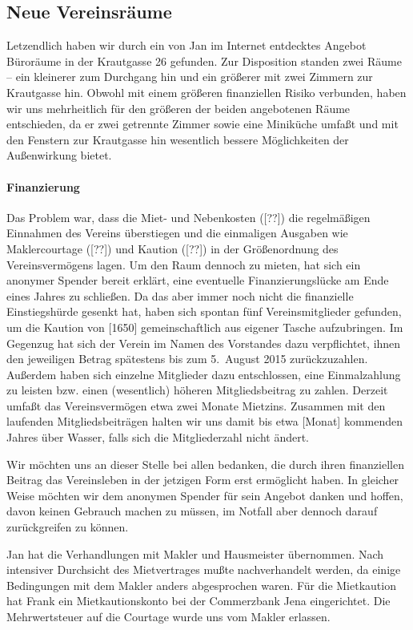 \documentclass[10pt,DIV16]{scrartcl}
\begin{document}
\subsection{Neue Vereinsräume}

Letzendlich haben wir durch ein von Jan im Internet entdecktes Angebot
Büroräume in der Krautgasse 26 gefunden.  Zur Disposition standen zwei Räume
-- ein kleinerer zum Durchgang hin und ein größerer mit zwei Zimmern zur
Krautgasse hin.  Obwohl mit einem größeren finanziellen Risiko verbunden,
haben wir uns mehrheitlich für den größeren der beiden angebotenen Räume
entschieden, da er zwei getrennte Zimmer sowie eine Miniküche umfaßt und mit
den Fenstern zur Krautgasse hin wesentlich bessere Möglichkeiten der
Außenwirkung bietet.

\paragraph{Finanzierung}

Das Problem war, dass die Miet- und Nebenkosten ([??\EUR]) die regelmäßigen
Einnahmen des Vereins überstiegen und die einmaligen Ausgaben wie
Maklercourtage ([??\EUR]) und Kaution ([??\EUR]) in der Größenordnung des
Vereinsvermögens lagen.  Um den Raum dennoch zu mieten, hat sich ein anonymer
Spender bereit erklärt, eine eventuelle Finanzierungslücke am Ende eines
Jahres zu schließen.  Da das aber immer noch nicht die finanzielle
Einstiegshürde gesenkt hat, haben sich spontan fünf Vereinsmitglieder
gefunden, um die Kaution von [1650\EUR] gemeinschaftlich aus eigener Tasche
aufzubringen.  Im Gegenzug hat sich der Verein im Namen des Vorstandes dazu
verpflichtet, ihnen den jeweiligen Betrag spätestens bis zum 5.\ August 2015
zurückzuzahlen.  Außerdem haben sich einzelne Mitglieder dazu entschlossen,
eine Einmalzahlung zu leisten bzw. einen (wesentlich) höheren Mitgliedsbeitrag
zu zahlen.  Derzeit umfaßt das Vereinsvermögen etwa zwei Monate Mietzins.
Zusammen mit den laufenden Mitgliedsbeiträgen halten wir uns damit bis etwa
[Monat] kommenden Jahres über Wasser, falls sich die Mitgliederzahl nicht
ändert.

Wir möchten uns an dieser Stelle bei allen bedanken, die durch ihren
finanziellen Beitrag das Vereinsleben in der jetzigen Form erst ermöglicht
haben.  In gleicher Weise möchten wir dem anonymen Spender für sein Angebot
danken und hoffen, davon keinen Gebrauch machen zu müssen, im Notfall aber
dennoch darauf zurückgreifen zu können.

Jan hat die Verhandlungen mit Makler und Hausmeister übernommen.  Nach
intensiver Durchsicht des Mietvertrages mußte nachverhandelt werden, da einige
Bedingungen mit dem Makler anders abgesprochen waren.  Für die Mietkaution hat
Frank ein Mietkautionskonto bei der Commerzbank Jena eingerichtet.  Die
Mehrwertsteuer auf die Courtage wurde uns vom Makler erlassen.
\end{document}
